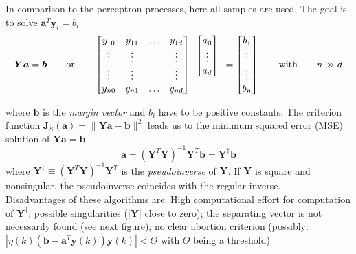     In comparison to the perceptron processes, here all samples are used. 
    The goal is to solve $\bm a^T \bm y_i = b_i$
    \begin{equation*}
    \bm Y \bm a = \bm b
    \qquad \text{or} \qquad
    \begin{bmatrix}
      y_{10} & y_{11} & \ldots & y_{1d}\\
      \vdots &\vdots & & \vdots\\
      \vdots &\vdots & & \vdots\\
      y_{n0} & y_{n1} & \ldots & y_{nd}\\
    \end{bmatrix}
    \begin{array}{c}
    \begin{bmatrix}
    	a_0\\
    	\vdots\\
    	a_d
    \end{bmatrix}\\
    \vphantom{\vdots}\\
    \end{array} = 
    \begin{bmatrix}
    	b_1\\
    	\vdots\\
    	\vdots\\
    	b_n
    \end{bmatrix} \qquad \text{with} \qquad n \gg d
    \end{equation*}
    
    where $\bm{b}$ is the \emph{margin vector} and $b_i$ have to be positive constants. 
    The criterion function $\bm J_S(\bm a)=\|\bm Y \bm a - \bm b \|^2$ leads 
    us to the minimum squared error (MSE) solution of $\bm Y \bm a = \bm b$
    \begin{equation*}
        \bm a = (\bm Y^T \bm Y)^{-1} \bm Y^T \bm b = \bm Y^\dagger \bm b
    \end{equation*}
    where $\bm Y^\dagger \equiv (\bm Y^T \bm Y)^{-1} \bm Y^T$ is the \emph{pseudoinverse} of $\bm Y$.
    If $\bm Y$ is square and nonsingular, the pseudoinverse coincides with the regular inverse. \\

    Disadvantages of these algorithms are: High computational effort for computation of $\bm Y^\dagger$;
    possible singularities ($|\bm Y|$ close to zero); the separating vector is not necessarily found (see next figure);
    no clear abortion criterion (possibly: $|\eta(k) (\bm b - \bm a^T \bm y(k)) \bm y(k)| < \Theta$ with $\Theta$ being a threshold)\\
    
